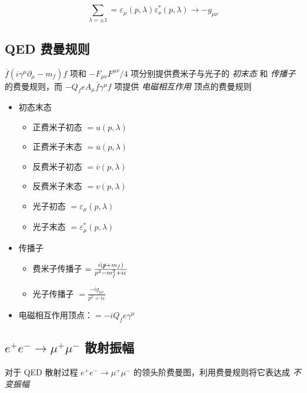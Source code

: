 \begin{equation}
    \sum_{\lambda=\pm 1} = \varepsilon_\mu(p, \lambda) \varepsilon^*_\nu(p, \lambda) \to -g_{\mu\nu}
\end{equation}

\subsection{QED 费曼规则}

$\overline{f} (i \gamma^\mu \partial_\mu - m_f) f$ 项和 $-F_{\mu\nu} F^{\mu\nu}/4$ 项分别提供费米子与光子的 \emph{初末态} 和 \emph{传播子} 的费曼规则，而 $-Q_f e A_\mu \overline{f} \gamma^\mu f$ 项提供 \emph{电磁相互作用} 顶点的费曼规则

\begin{itemize}
    \item 初态末态
        \begin{itemize}
            \item 正费米子初态 $=u(p, \lambda)$
            \item 正费米子末态 $=\overline{u}(p, \lambda)$
            \item 反费米子初态 $=\overline{v}(p, \lambda)$
            \item 反费米子末态 $=v(p, \lambda)$
            \item 光子初态 $=\varepsilon_\mu(p, \lambda)$
            \item 光子末态 $=\varepsilon^*_\mu(p, \lambda)$
        \end{itemize}
    \item 传播子
        \begin{itemize}
            \item 费米子传播子 $=\frac{i(\slashed{p} + m_f)}{p^2 - m_f^2 + i\varepsilon}$
            \item 光子传播子 $=\frac{-i g_{\mu\nu}}{p^2 + i\varepsilon}$
        \end{itemize}
    \item 电磁相互作用顶点：$=-i Q_f e \gamma^\mu$
\end{itemize}

\subsection{\texorpdfstring{$e^+ e^- \to \mu^+ \mu^-$}{e+e- -> mu+mu-} 散射振幅}

对于 QED 散射过程 $e^+ e^- \to \mu^+ \mu^-$ 的领头阶费曼图，利用费曼规则将它表达成 \emph{不变振幅}

